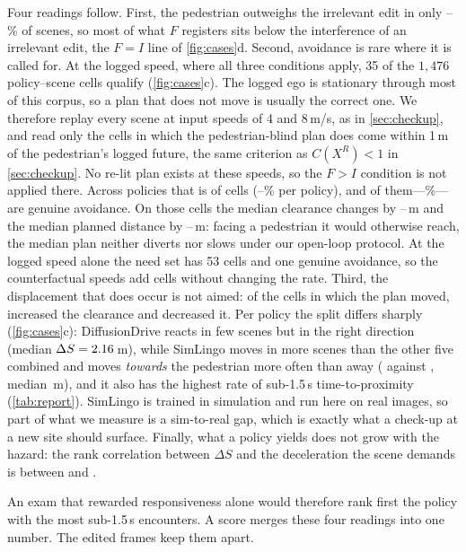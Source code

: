 Four readings follow. First, the pedestrian outweighs the irrelevant edit in only
\NumFgtIlo--\NumFgtIhi\% of scenes, so most of what $F$ registers sits below the interference of an irrelevant edit, the $F=I$ line of \cref{fig:cases}d. Second, avoidance is rare where it is called for. At the logged speed, where all three conditions apply, 35 of the $1{,}476$ policy--scene cells qualify (\cref{fig:cases}c). The logged ego is
stationary through most of this corpus, so a plan that does not move is usually the correct one. We therefore replay every scene at input speeds of 4 and 8\,m/s, as in \cref{sec:checkup}, and read only the cells in which the pedestrian-blind plan does come within 1\,m of the pedestrian's logged future, the same criterion as $C(X^{R})<1$ in \cref{sec:checkup}. No re-lit plan exists at these speeds, so the $F>I$ condition is not applied there.
Across \NumCfModels{} policies that is \NumCfNeed{} of \NumCfCells{} cells (\NumCfNeedLo--\NumCfNeedHi\%
per policy), and \NumCfReal{} of them---\NumCfRealPct\%---are genuine avoidance. On those cells the
median clearance changes by \NumCfDsLo--\NumCfDsHi\,m and the median planned distance by
\NumCfArcLo--\NumCfArcHi\,m: facing a pedestrian it would otherwise reach, the median plan neither diverts nor slows under our open-loop protocol. At the logged speed alone the need set has 53 cells and one genuine avoidance, so the counterfactual speeds add cells without changing the rate. Third, the displacement that does occur is not aimed: of the
\NumMoveN{} cells in which the plan moved, \NumMoveFar{} increased the clearance and \NumMoveNear{}
decreased it. Per policy the split differs sharply (\cref{fig:cases}c): DiffusionDrive reacts in few
scenes but in the right direction (median $\Delta S=2.16$\,m), while SimLingo moves in more
scenes than the other five combined and moves \emph{towards} the pedestrian more often than away
(\NumSLnear{} against \NumSLfar, median \NumSLmed\,m), and it also has the highest rate of sub-1.5\,s time-to-proximity (\cref{tab:report}). SimLingo is trained in simulation and run here on real images, so part of what we measure is a sim-to-real gap, which is exactly what a check-up at a new site should surface. Finally, what a policy yields does not grow with the hazard: the
rank correlation between $\Delta S$ and the deceleration the scene demands is between \NumRhoLo{} and \NumRhoHi{}.

An exam that rewarded responsiveness alone would therefore rank first the policy with the most sub-1.5\,s encounters. A score merges these four readings into one number. The edited frames keep them apart.
